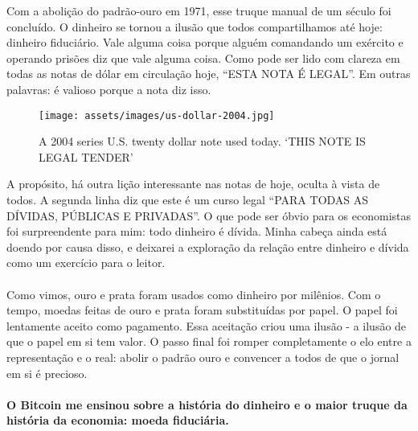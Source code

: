 Com a abolição do padrão-ouro em 1971, esse truque manual de um século foi concluído. O dinheiro 
se tornou a ilusão que todos compartilhamos até hoje: dinheiro fiduciário. Vale alguma coisa porque 
alguém comandando um exército e operando prisões diz que vale alguma coisa. Como pode ser lido com 
clareza em todas as notas de dólar em circulação hoje, \enquote{ESTA NOTA É LEGAL}. Em outras palavras: 
é valioso porque a nota diz isso.

\begin{figure}
  \centering
  \texttt{[image: assets/images/us-dollar-2004.jpg]}
  \caption{A 2004 series U.S. twenty dollar note used today. `THIS NOTE IS LEGAL TENDER'}
  \label{fig:us-dollar-2004}
\end{figure}

A propósito, há outra lição interessante nas notas de hoje, oculta à vista de todos. A segunda 
linha diz que este é um curso legal \enquote{PARA TODAS AS DÍVIDAS, PÚBLICAS E PRIVADAS}. O que 
pode ser óbvio para os economistas foi surpreendente para mim: todo dinheiro é dívida. Minha 
cabeça ainda está doendo por causa disso, e deixarei a exploração da relação entre dinheiro e 
dívida como um exercício para o leitor.

\paragraph{}
Como vimos, ouro e prata foram usados como dinheiro por milênios. Com o tempo, moedas feitas 
de ouro e prata foram substituídas por papel. O papel foi lentamente aceito como pagamento. 
Essa aceitação criou uma ilusão - a ilusão de que o papel em si tem valor. O passo final foi 
romper completamente o elo entre a representação e o real: abolir o padrão ouro e convencer a 
todos de que o jornal em si é precioso.

\paragraph{O Bitcoin me ensinou sobre a história do dinheiro e o maior truque da história 
da economia: moeda fiduciária.}

%
%
%
%
